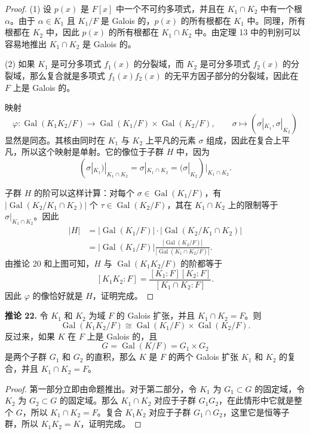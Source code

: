 \begin{proof}
(1) 设 $p(x)$ 是 $F[x]$ 中一个不可约多项式，并且在 $K_1\cap K_2$ 中有一个根 $\alpha$。由于 $\alpha\in K_1$ 且 $K_1/F$ 是 Galois 的，$p(x)$ 的所有根都在 $K_1$ 中。同理，所有根都在 $K_2$ 中，因此 $p(x)$ 的所有根都在 $K_1\cap K_2$ 中。由定理 13 中的判别可以容易地推出 $K_1\cap K_2$ 是 Galois 的。

(2) 如果 $K_1$ 是可分多项式 $f_1(x)$ 的分裂域，而 $K_2$ 是可分多项式 $f_2(x)$ 的分裂域，那么复合就是多项式 $f_1(x)f_2(x)$ 的无平方因子部分的分裂域，因此在 $F$ 上是 Galois 的。

映射
\[
\varphi:\operatorname{Gal}(K_1K_2/F)\longrightarrow
\operatorname{Gal}(K_1/F)\times\operatorname{Gal}(K_2/F),
\qquad
\sigma\longmapsto (\sigma|_{K_1},\sigma|_{K_2})
\]
显然是同态。其核由同时在 $K_1$ 与 $K_2$ 上平凡的元素 $\sigma$ 组成，因此在复合上平凡，所以这个映射是单射。它的像位于子群 $H$ 中，因为
\[
(\sigma|_{K_1})|_{K_1\cap K_2}=\sigma|_{K_1\cap K_2}=(\sigma|_{K_2})|_{K_1\cap K_2}.
\]

子群 $H$ 的阶可以这样计算：对每个 $\sigma\in\operatorname{Gal}(K_1/F)$，有 $|\operatorname{Gal}(K_2/K_1\cap K_2)|$ 个 $\tau\in\operatorname{Gal}(K_2/F)$，其在 $K_1\cap K_2$ 上的限制等于 $\sigma|_{K_1\cap K_2}$。因此
\[
\begin{aligned}
|H|&=|\operatorname{Gal}(K_1/F)|\cdot |\operatorname{Gal}(K_2/K_1\cap K_2)|\\
&=|\operatorname{Gal}(K_1/F)|\frac{|\operatorname{Gal}(K_2/F)|}{|\operatorname{Gal}(K_1\cap K_2/F)|}.
\end{aligned}
\]
由推论 20 和上图可知，$H$ 与 $\operatorname{Gal}(K_1K_2/F)$ 的阶都等于
\[
[K_1K_2:F]=\frac{[K_1:F][K_2:F]}{[K_1\cap K_2:F]}.
\]
因此 $\varphi$ 的像恰好就是 $H$，证明完成。
\end{proof}

\noindent\textbf{推论 22.} 令 $K_1$ 和 $K_2$ 为域 $F$ 的 Galois 扩张，并且 $K_1\cap K_2=F$。则
\[
\operatorname{Gal}(K_1K_2/F)\cong \operatorname{Gal}(K_1/F)\times\operatorname{Gal}(K_2/F).
\]
反过来，如果 $K$ 在 $F$ 上是 Galois 的，且
\[
G=\operatorname{Gal}(K/F)=G_1\times G_2
\]
是两个子群 $G_1$ 和 $G_2$ 的直积，那么 $K$ 是 $F$ 的两个 Galois 扩张 $K_1$ 和 $K_2$ 的复合，并且 $K_1\cap K_2=F$。

\begin{proof}
第一部分立即由命题推出。对于第二部分，令 $K_1$ 为 $G_1\subset G$ 的固定域，令 $K_2$ 为 $G_2\subset G$ 的固定域。那么 $K_1\cap K_2$ 对应于子群 $G_1G_2$，在此情形中它就是整个 $G$，所以 $K_1\cap K_2=F$。复合 $K_1K_2$ 对应于子群 $G_1\cap G_2$，这里它是恒等子群，所以 $K_1K_2=K$，证明完成。
\end{proof}


